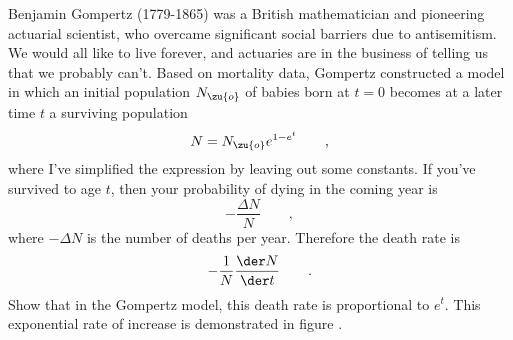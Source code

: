 Benjamin Gompertz (1779-1865) was a British mathematician and pioneering
actuarial scientist, who overcame significant social barriers due to
antisemitism. We would all like to live forever, and actuaries are in
the business of telling us that we probably can't. Based on mortality
data, Gompertz constructed a model in which an initial population $N_\zu{o}$
of babies born at $t=0$ becomes at a later time $t$ a surviving population
\begin{equation*}
  N = N_\zu{o} e^{1-e^t} \qquad ,
\end{equation*}
where I've simplified the expression by leaving out some constants.
If you've survived to age $t$, then your probability of dying in the coming
year is
\begin{equation*}
  -\frac{\Delta N}{N} \qquad ,
\end{equation*}
where $-\Delta N$ is the number of deaths per year. Therefore the death rate is
\begin{equation*}
  -\frac{1}{N}\frac{\der N}{\der t} \qquad .
\end{equation*}
Show that in the Gompertz model, this death rate is proportional to
$e^t$. This exponential rate of increase is demonstrated in figure
.
